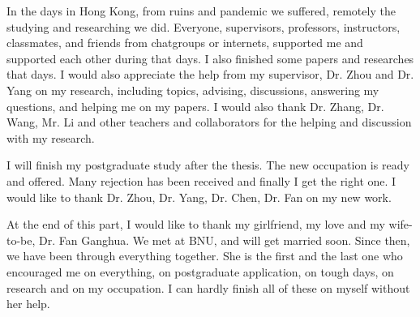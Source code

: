 In the days in Hong Kong, from ruins and pandemic we suffered, remotely the studying and researching we did. 
Everyone, supervisors, professors, instructors, classmates, 
and friends from chatgroups or internets, supported me
and supported each other during that days. 
I also finished some papers and researches that days. 
I would also appreciate the help from my supervisor, 
Dr. Zhou and Dr. Yang on my research, including topics, advising, discussions, answering my questions, 
and helping me on my papers.  
I would also thank Dr. Zhang, Dr. Wang, Mr. Li and other teachers and collaborators for the helping and discussion with my research.

I will finish my postgraduate study after the thesis. 
The new occupation is ready and offered. 
Many rejection has been received and finally I get 
the right one. I would like to thank Dr. Zhou, 
Dr. Yang, Dr. Chen, Dr. Fan on my new work. 

At the end of this part, I would like to thank my girlfriend, my love and my wife-to-be, Dr. Fan Ganghua. 
We met at BNU, and will get married soon. Since then, 
we have been through everything together. 
She is the first and the last one who encouraged me on everything, on postgraduate application, 
on tough days, on research and on my occupation. 
I can hardly finish all of these on myself without her help.



